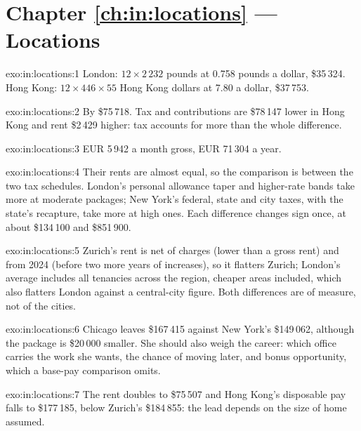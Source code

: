 \section*{Chapter \ref{ch:in:locations} --- Locations}

\begin{solution}{exo:in:locations:1}
London: $12\times2\,232$ pounds at 0.758 pounds a dollar, \$35\,324. Hong Kong: $12\times446\times55$ Hong Kong dollars at
7.80 a dollar, \$37\,753.
\end{solution}

\begin{solution}{exo:in:locations:2}
By \$75\,718. Tax and contributions are \$78\,147 lower in Hong Kong and rent \$2\,429 higher: tax accounts for more than
the whole difference.
\end{solution}

\begin{solution}{exo:in:locations:3}
EUR 5\,942 a month gross, EUR 71\,304 a year.
\end{solution}

\begin{solution}{exo:in:locations:4}
Their rents are almost equal, so the comparison is between the two tax schedules. London's personal allowance taper and
higher-rate bands take more at moderate packages; New York's federal, state and city taxes, with the state's recapture,
take more at high ones. Each difference changes sign once, at about \$134\,100 and \$851\,900.
\end{solution}

\begin{solution}{exo:in:locations:5}
Zurich's rent is net of charges (lower than a gross rent) and from 2024 (before two more years of increases), so it
flatters Zurich; London's average includes all tenancies across the region, cheaper areas included, which also flatters
London against a central-city figure. Both differences are of measure, not of the cities.
\end{solution}

\begin{solution}{exo:in:locations:6}
Chicago leaves \$167\,415 against New York's \$149\,062, although the package is \$20\,000 smaller. She should also weigh
the career: which office carries the work she wants, the chance of moving later, and bonus opportunity, which a base-pay
comparison omits.
\end{solution}

\begin{solution}{exo:in:locations:7}
The rent doubles to \$75\,507 and Hong Kong's disposable pay falls to \$177\,185, below Zurich's \$184\,855: the lead
depends on the size of home assumed.
\end{solution}

